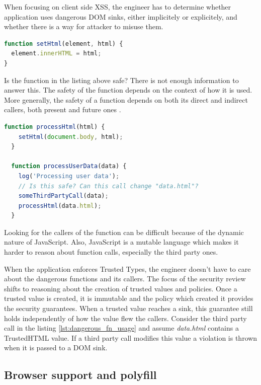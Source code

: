 When focusing on client side XSS, the engineer has to determine whether application uses dangerous
DOM sinks, either implicitely or explicitely, and whether there is a way for attacker to misuse them.

\bigskip
\begin{lstlisting}[language=JavaScript, caption=Possibly dangerous function]
function setHtml(element, html) {
  element.innerHTML = html;
}
\end{lstlisting}

Is the function in the listing above safe? There is not enough information to answer this. The
safety of the function depends on the context of how it is used. More generally, the safety of a
function depends on both its direct and indirect callers, both present and future ones
\cite{tt_design_history}.

\bigskip
\begin{lstlisting}[language=JavaScript, caption=Usage of the possibly dangerous function, label={lst:dangerous_fn_usage}]
  function processHtml(html) {
    setHtml(document.body, html);
  }

  function processUserData(data) {
    log('Processing user data');
    // Is this safe? Can this call change "data.html"?
    someThirdPartyCall(data);
    processHtml(data.html);
  }
\end{lstlisting}

Looking for the callers of the function can be difficult because of the dynamic nature of
JavaScript. Also, JavaScript is a mutable language which makes it harder to reason about function
calls, especially the third party ones.

When the application enforces Trusted Types, the engineer doesn't have to care about the dangerous
functions and its callers. The focus of the security review shifts to reasoning about the creation
of trusted values and policies. Once a trusted value is created, it is immutable and the policy
which created it provides the security guarantees. When a trusted value reaches a sink, this
guarantee still holds independently of how the value flew the callers. Consider the third party call
in the listing \ref{lst:dangerous_fn_usage} and assume \textit{data.html} contains a TrustedHTML
value. If a third party call modifies this value a violation is thrown when it is passed to a DOM
sink.

\subsection{Browser support and polyfill}

